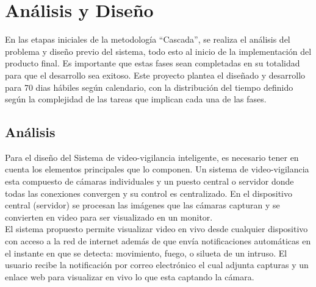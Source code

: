 \chapter{Análisis y Diseño}

En las etapas iniciales de la metodología ``Cascada'', se realiza el análisis del problema y diseño previo del sistema, todo esto al inicio de la implementación del producto final. Es importante que estas fases sean completadas en su totalidad para que el desarrollo sea exitoso. Este proyecto plantea el diseñado y desarrollo para 70 dias hábiles según calendario, con la distribución del tiempo definido según la complejidad de las tareas que implican cada una de las fases.\\

\section{Análisis}
Para el diseño del Sistema de video-vigilancia inteligente, es necesario tener en cuenta los elementos principales que lo componen. Un sistema de video-vigilancia esta compuesto de cámaras individuales y un puesto central o servidor donde todas las conexiones convergen y su control es centralizado. En el dispositivo central (servidor) se procesan las imágenes que las cámaras capturan y se convierten en video para ser visualizado en un monitor.\\

El sistema propuesto permite visualizar video en vivo desde cualquier dispositivo con acceso a la red de internet además de que envía notificaciones automáticas en el instante en que se detecta: movimiento, fuego, o silueta de un intruso. El usuario recibe la notificación por correo electrónico el cual adjunta capturas y un enlace web para visualizar en vivo lo que esta captando la cámara.\\


